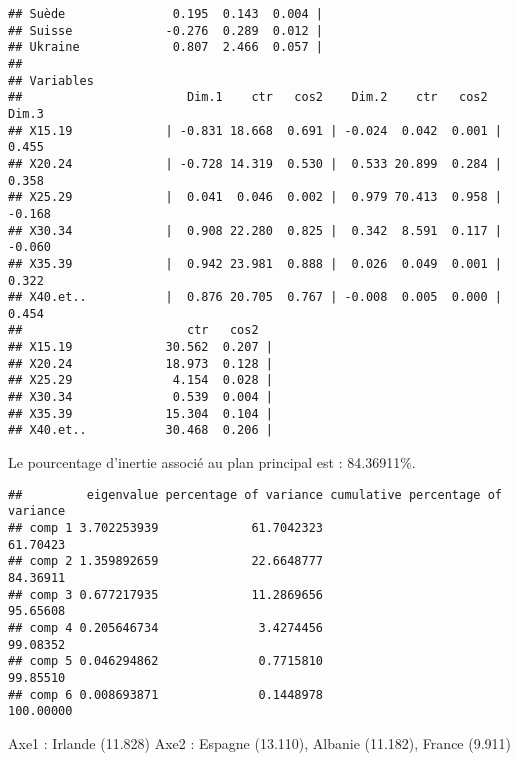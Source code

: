 \documentclass[
]{article}
\newenvironment{Shaded}{\begin{snugshade}}{\end{snugshade}}
\newcommand{\NormalTok}[1]{#1}
\newcommand{\SpecialCharTok}[1]{\textcolor[rgb]{0.00,0.00,0.00}{#1}}
\begin{document}
\begin{verbatim}
## Suède               0.195  0.143  0.004 |
## Suisse             -0.276  0.289  0.012 |
## Ukraine             0.807  2.466  0.057 |
## 
## Variables
##                       Dim.1    ctr   cos2    Dim.2    ctr   cos2    Dim.3
## X15.19             | -0.831 18.668  0.691 | -0.024  0.042  0.001 |  0.455
## X20.24             | -0.728 14.319  0.530 |  0.533 20.899  0.284 |  0.358
## X25.29             |  0.041  0.046  0.002 |  0.979 70.413  0.958 | -0.168
## X30.34             |  0.908 22.280  0.825 |  0.342  8.591  0.117 | -0.060
## X35.39             |  0.942 23.981  0.888 |  0.026  0.049  0.001 |  0.322
## X40.et..           |  0.876 20.705  0.767 | -0.008  0.005  0.000 |  0.454
##                       ctr   cos2  
## X15.19             30.562  0.207 |
## X20.24             18.973  0.128 |
## X25.29              4.154  0.028 |
## X30.34              0.539  0.004 |
## X35.39             15.304  0.104 |
## X40.et..           30.468  0.206 |
\end{verbatim}

Le pourcentage d'inertie associé au plan principal est : 84.36911\%.

\begin{Shaded}
\end{Shaded}

\begin{verbatim}
##         eigenvalue percentage of variance cumulative percentage of variance
## comp 1 3.702253939             61.7042323                          61.70423
## comp 2 1.359892659             22.6648777                          84.36911
## comp 3 0.677217935             11.2869656                          95.65608
## comp 4 0.205646734              3.4274456                          99.08352
## comp 5 0.046294862              0.7715810                          99.85510
## comp 6 0.008693871              0.1448978                         100.00000
\end{verbatim}

Axe1 : Irlande (11.828) Axe2 : Espagne (13.110), Albanie (11.182),
France (9.911)

\begin{Shaded}
\end{Shaded}
\end{document}
